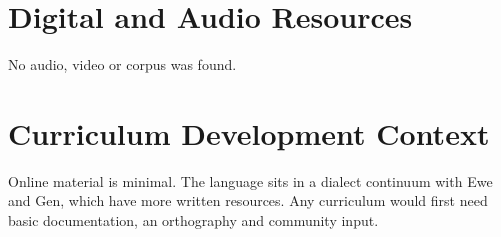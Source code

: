 \documentclass[12pt]{article}
\begin{document}
\section{Digital and Audio Resources}
No audio, video or corpus was found.

\section{Curriculum Development Context}
Online material is minimal. The language sits in a dialect continuum with Ewe and Gen, which have more written resources. Any curriculum would first need basic documentation, an orthography and community input.
\end{document}

